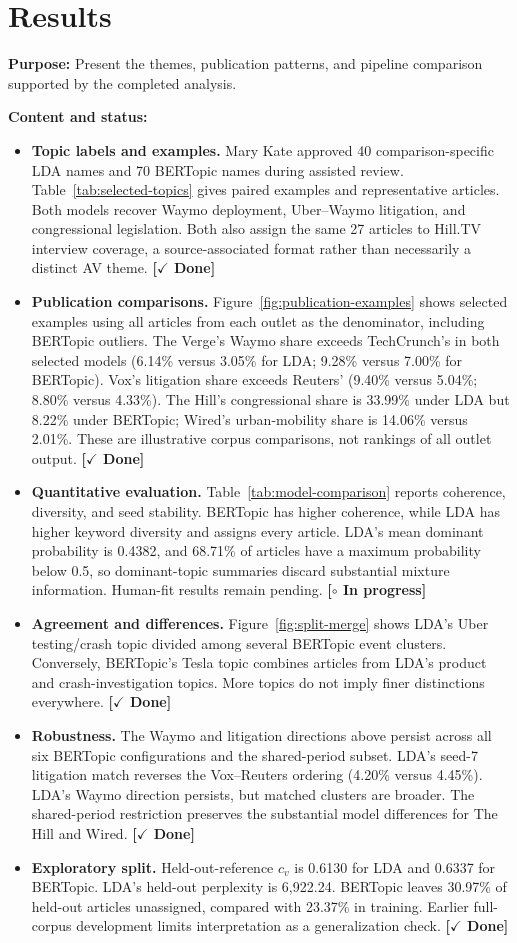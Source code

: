 \documentclass[conference]{IEEEtran}
\newcommand{\done}{\textcolor{green!40!black}{\textbf{[$\checkmark$ Done]}}}
\newcommand{\wip}{\textcolor{orange!70!black}{\textbf{[$\circ$ In progress]}}}
\begin{document}
\section*{Results}
\textbf{Purpose:} Present the themes, publication patterns, and pipeline comparison supported by the completed analysis.

\textbf{Content and status:}
\begin{itemize}
    \item \textbf{Topic labels and examples.} Mary Kate approved 40 comparison-specific LDA names and 70 BERTopic names during assisted review. Table~\ref{tab:selected-topics} gives paired examples and representative articles. Both models recover Waymo deployment, Uber--Waymo litigation, and congressional legislation. Both also assign the same 27 articles to Hill.TV interview coverage, a source-associated format rather than necessarily a distinct AV theme. \done
    \item \textbf{Publication comparisons.} Figure~\ref{fig:publication-examples} shows selected examples using all articles from each outlet as the denominator, including BERTopic outliers. The Verge's Waymo share exceeds TechCrunch's in both selected models (6.14\% versus 3.05\% for LDA; 9.28\% versus 7.00\% for BERTopic). Vox's litigation share exceeds Reuters' (9.40\% versus 5.04\%; 8.80\% versus 4.33\%). The Hill's congressional share is 33.99\% under LDA but 8.22\% under BERTopic; Wired's urban-mobility share is 14.06\% versus 2.01\%. These are illustrative corpus comparisons, not rankings of all outlet output. \done
    \item \textbf{Quantitative evaluation.} Table~\ref{tab:model-comparison} reports coherence, diversity, and seed stability. BERTopic has higher coherence, while LDA has higher keyword diversity and assigns every article. LDA's mean dominant probability is 0.4382, and 68.71\% of articles have a maximum probability below 0.5, so dominant-topic summaries discard substantial mixture information. Human-fit results remain pending. \wip
    \item \textbf{Agreement and differences.} Figure~\ref{fig:split-merge} shows LDA's Uber testing/crash topic divided among several BERTopic event clusters. Conversely, BERTopic's Tesla topic combines articles from LDA's product and crash-investigation topics. More topics do not imply finer distinctions everywhere. \done
    \item \textbf{Robustness.} The Waymo and litigation directions above persist across all six BERTopic configurations and the shared-period subset. LDA's seed-7 litigation match reverses the Vox--Reuters ordering (4.20\% versus 4.45\%). LDA's Waymo direction persists, but matched clusters are broader. The shared-period restriction preserves the substantial model differences for The Hill and Wired. \done
    \item \textbf{Exploratory split.} Held-out-reference $c_v$ is 0.6130 for LDA and 0.6337 for BERTopic. LDA's held-out perplexity is 6,922.24. BERTopic leaves 30.97\% of held-out articles unassigned, compared with 23.37\% in training. Earlier full-corpus development limits interpretation as a generalization check. \done
\end{itemize}
\end{document}
